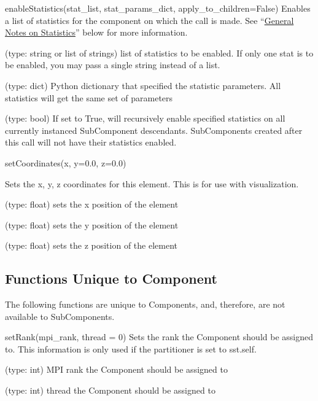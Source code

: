 \begin{functiondoc}{enableStatistics(stat_list, stat_params_dict,
  apply_to_children=False)}{ Enables a list of statistics for the
    component on which the call is made.  See
    ``\hyperref[sec:gen-notes-stats]{General Notes on Statistics}''
    below for more information.  }

   (type: string or list of strings) list of
  statistics to be enabled.  If only one stat is to be enabled, you
  may pass a single string instead of a list.

   (type: dict) Python dictionary that
  specified the statistic parameters.  All statistics will get the
  same set of parameters

   (type: bool) If set to True, will
  recursively enable specified statistics on all currently instanced
  SubComponent descendants. SubComponents created after this call will
  not have their statistics enabled.

  \noreturn
\end{functiondoc}
  

\begin{functiondoc}{setCoordinates(x, y=0.0, z=0.0)}{

  Sets the x, y, z coordinates for this element.  This is for use with
  visualization.
}

   (type: float) sets the x position of the element
  
   (type: float) sets the y position of the element
  
   (type: float) sets the z position of the element

  \noreturn

\end{functiondoc}
  
  
\subsection{Functions Unique to Component}

The following functions are unique to Components, and, therefore, are
not available to SubComponents.

\begin{functiondoc}{setRank(mpi_rank, thread = 0)}{
  Sets the rank the Component should be assigned to.  This information
  is only used if the partitioner is set to sst.self.  }

   (type: int) MPI rank the Component should be
  assigned to

   (type: int) thread the Component should be assigned
  to

  \noreturn
\end{functiondoc}
  
